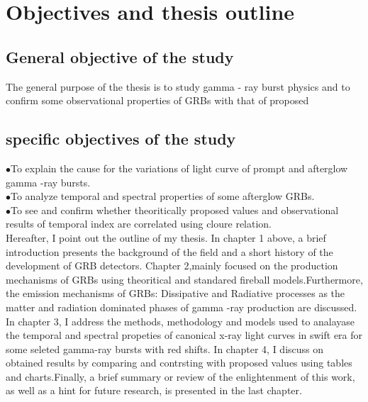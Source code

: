 \section{Objectives and thesis outline}
\subsection{General objective of the study}
The general purpose of the thesis is to study gamma - ray burst physics and to confirm some observational properties of GRBs with that of proposed   
\subsection{specific objectives of the study}
$\bullet$To explain the cause for the  variations of light curve of prompt and afterglow gamma -ray bursts.\\
$\bullet$To analyze temporal and spectral properties of some afterglow GRBs.\\
$\bullet$To see and confirm  whether theoritically proposed values  and observational results  of  temporal index are correlated using cloure relation.\\
 Hereafter, I point out the outline of my thesis.
 In chapter 1 above, a brief introduction presents the background of the field and a short history of the development of GRB detectors. 
  Chapter 2,mainly focused on the production mechanisms of GRBs  using theoritical and standared fireball models.Furthermore, the emission  mechanisms of GRBs: Dissipative and Radiative processes as the matter and radiation dominated phases of gamma -ray production are  discussed.
In chapter 3, I address the methods, methodology and  models used to analayase the temporal and spectral propeties of canonical x-ray light curves in swift era for some seleted gamma-ray bursts with red shifts.
In chapter 4, I discuss on obtained results by comparing and contrsting  with proposed values using tables and charts.Finally, a brief summary or review of the enlightenment of this work, as well as a hint for future research, is presented in the last chapter. 
